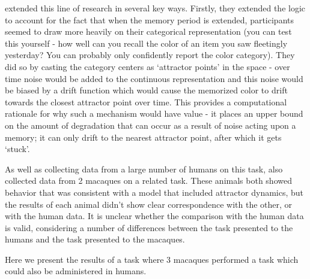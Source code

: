 \cite{panichello_error-correcting_2019} extended this line of research in several key ways. 
Firstly, they extended the logic to account for the fact that when the memory period is extended, participants seemed to draw more heavily on their categorical representation (you can test this yourself - how well can you recall the color of an item you saw fleetingly yesterday? 
You can probably only confidently report the color category). 
They did so by casting the category centers as `attractor points' in the space - over time noise would be added to the continuous representation and this noise would be biased by a drift function which would cause the memorized color to drift towards the closest attractor point over time. 
This provides a computational rationale for why such a mechanism would have value - it places an upper bound on the amount of degradation that can occur as a result of noise acting upon a memory; it can only drift to the nearest attractor point, after which it gets `stuck'.

As well as collecting data from a large number of humans on this task, \cite{panichello_error-correcting_2019} also collected data from 2 macaques on a related task. 
These animals both showed behavior that was consistent with a model that included attractor dynamics, but the results of each animal didn't show clear correspondence with the other, or with the human data.
It is unclear whether the comparison with the human data is valid, considering a number of differences between the task presented to the humans and the task presented to the macaques.


Here we present the results of a task where 3 macaques performed a task which could also be administered in humans.

